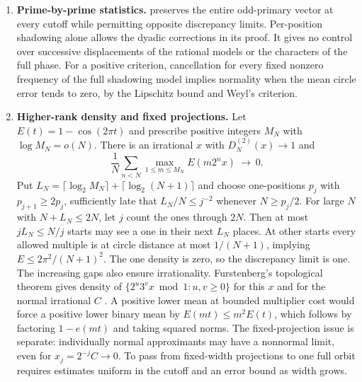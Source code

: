 \documentclass[11pt]{article}
\begin{document}
\begin{enumerate}[leftmargin=*,label=\textbf{\arabic*.}]
\item \textbf{Prime-by-prime statistics.}
 preserves the entire odd-primary vector at every cutoff while permitting opposite discrepancy limits. Per-position shadowing alone allows the dyadic corrections in its proof. It gives no control over successive displacements of the rational models or the characters of the full phase. For a positive criterion, cancellation for every fixed nonzero frequency of the full shadowing model implies normality when the mean circle error tends to zero, by the Lipschitz bound and Weyl's criterion.

\item \textbf{Higher-rank density and fixed projections.}
Let \(E(t)=1-\cos(2\pi t)\) and prescribe positive integers \(M_N\) with \(\log M_N=o(N)\). There is an irrational \(x\) with \(D_N^{(2)}(x)\to1\) and
\[
  \frac1N\sum_{n<N}\max_{1\le m\le M_N} E(m2^nx)\ \longrightarrow\ 0 .
\]
Put \(L_N=\lceil\log_2 M_N\rceil+\lceil\log_2(N+1)\rceil\) and choose one-positions \(p_j\) with \(p_{j+1}\ge 2p_j\), sufficiently late that \(L_N/N\le j^{-2}\) whenever \(N\ge p_j/2\). For large \(N\) with \(N+L_N\le 2N\), let \(j\) count the ones through \(2N\). Then at most \(jL_N\le N/j\) starts may see a one in their next \(L_N\) places. At other starts every allowed multiple is at circle distance at most \(1/(N+1)\), implying \(E\le2\pi^2/(N+1)^2\). The one density is zero, so the discrepancy limit is one. The increasing gaps also ensure irrationality. Furstenberg's topological theorem gives density of \(\{2^u3^v x\bmod1:u,v\ge0\}\) for this \(x\) and for the normal irrational \(C\) \cite[Theorem~IV.1, p.~48]{furstenberg}. A positive lower mean at bounded multiplier cost would force a positive lower binary mean by \(E(mt)\le m^2 E(t)\), which follows by factoring \(1-e(mt)\) and taking squared norms. The fixed-projection issue is separate: individually normal approximants may have a nonnormal limit, even for \(x_j=2^{-j}C\to0\). To pass from fixed-width projections to one full orbit requires estimates uniform in the cutoff and an error bound as width grows.


\end{enumerate}
\end{document}
